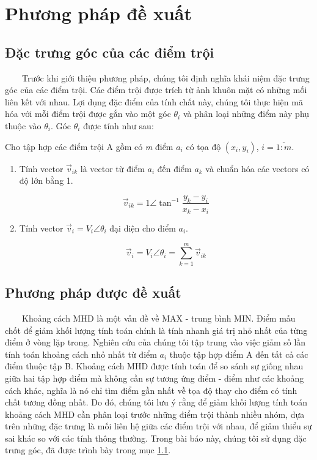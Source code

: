 \documentclass[runningheads]{llncs}
\begin{document}
\section{Phương pháp đề xuất}
\label{Content: Phuong phap de xuat}
\subsection{Đặc trưng góc của các điểm trội}
\label{ContentS: Dac trung goc}
~~~~Trước khi giới thiệu phương pháp, chúng tôi định nghĩa khái niệm đặc trưng góc của các điểm trội. Các điểm trội được trích từ ảnh khuôn mặt có những mối liên kết với nhau. Lợi dụng đặc điểm của tính chất này, chúng tôi thực hiện mã hóa với mỗi điểm trội được gắn vào một góc $\theta _i$ và phân loại những điểm này phụ thuộc vào $\theta _i$. Góc $\theta _i$ được tính như sau:

Cho tập hợp các điểm trội A gồm có \textit{m} điểm ${a_i}$ có tọa độ $(x_i,y_i)$, $i = \overline {1:m} $.
\begin{enumerate}

    \item Tính vector ${\vec v_{ik}}$ là vector từ điểm ${a_i}$ đến điểm ${a_k}$ và chuẩn hóa các vectors có độ lớn bằng 1.

    \[{\vec v_{ik}} = 1\angle {\tan ^{ - 1}}\frac{{{y_k} - {y_i}}}{{{x_k} - {x_i}}}\]
    \item Tính vector ${\vec v_i} = {V_i}\angle {\theta _i}$ đại diện cho điểm ${a_i}$.

    $${\vec v_i} = {V_i}\angle {\theta _i} = \sum\limits_{k = 1}^m {{{\vec v}_{ik}}} $$
\end{enumerate}

\subsection{Phương pháp được đề xuất}
\label{ContentS: Phuong phap duoc de xuat}
~~~~Khoảng cách MHD là một vấn đề về MAX - trung bình MIN. Điểm mấu chốt để giảm khối lượng tính toán chính là tính nhanh giá trị nhỏ nhất của từng điểm ở vòng lặp trong. Nghiên cứu của chúng tôi tập trung vào việc giảm số lần tính toán khoảng cách nhỏ nhất từ điểm $a_i$ thuộc tập hợp điểm A đến tất cả các điểm thuộc tập B. Khoảng cách MHD được tính toán để so sánh sự giống nhau giữa hai tập hợp điểm mà không cần sự tương ứng điểm - điểm như các khoảng cách khác, nghĩa là nó chỉ tìm điểm gần nhất về tọa độ thay cho điểm có tính chất tương đồng nhất. Do đó, chúng tôi lưu ý rằng để giảm khối lượng tính toán khoảng cách MHD cần phân loại trước những điểm trội thành nhiều nhóm, dựa trên những đặc trưng là mối liên hệ giữa các điểm trội với nhau, để giảm thiểu sự sai khác so với các tính thông thường. Trong bài báo này, chúng tôi sử dụng đặc trưng góc, đã được trình bày trong mục \ref{ContentS: Dac trung goc}.
\end{document}
